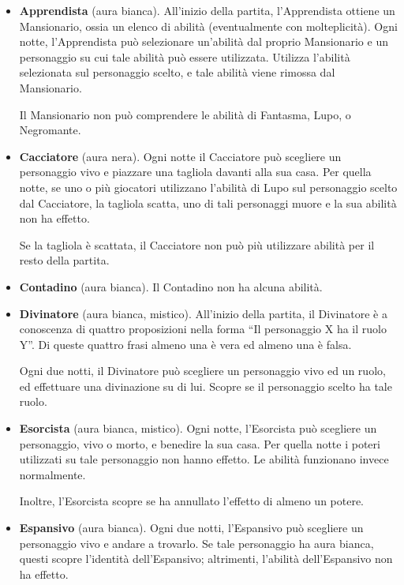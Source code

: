 \documentclass[a4paper,10pt]{article}
\begin{document}
\begin{itemize}
	        
	\item {\bf Apprendista} (aura bianca). All'inizio della partita, l'Apprendista ottiene un Mansionario, ossia un elenco di abilità (eventualmente con molteplicità). Ogni notte, l'Apprendista può selezionare un'abilità dal proprio Mansionario e un personaggio su cui tale abilità può essere utilizzata. Utilizza l'abilità selezionata sul personaggio scelto, e tale abilità viene rimossa dal Mansionario.
	
	Il Mansionario non può comprendere le abilità di Fantasma, Lupo, o Negromante.
	
	\item {\bf Cacciatore} (aura nera). Ogni notte il Cacciatore può scegliere un personaggio vivo e piazzare una tagliola davanti alla sua casa. Per quella notte, se uno o più giocatori utilizzano l'abilità di Lupo sul personaggio scelto dal Cacciatore, la tagliola scatta, uno di tali personaggi muore e la sua abilità non ha effetto.
	
    Se la tagliola è scattata, il Cacciatore non può più utilizzare abilità per il resto della partita.
	
	\item {\bf Contadino} (aura bianca). Il Contadino non ha alcuna abilità.

	\item {\bf Divinatore} (aura bianca, mistico). All'inizio della partita, il Divinatore è a conoscenza di quattro proposizioni nella forma ``Il personaggio X ha il ruolo Y''. Di queste quattro frasi almeno una è vera ed almeno una è falsa.
	
	Ogni due notti, il Divinatore può scegliere un personaggio vivo ed un ruolo, ed effettuare una divinazione su di lui. Scopre se il personaggio scelto ha tale ruolo.

	\item {\bf Esorcista} (aura bianca, mistico). Ogni notte, l'Esorcista può scegliere un personaggio, vivo o morto, e benedire la sua casa. Per quella notte i poteri utilizzati su tale personaggio non hanno effetto. Le abilità funzionano invece normalmente.

    Inoltre, l'Esorcista scopre se ha annullato l'effetto di almeno un potere.
 
	\item {\bf Espansivo} (aura bianca). Ogni due notti, l'Espansivo può scegliere un personaggio vivo e andare a trovarlo. Se tale personaggio ha aura bianca, questi scopre l'identità dell'Espansivo; altrimenti, l'abilità dell'Espansivo non ha effetto.


\end{itemize}
\end{document}
